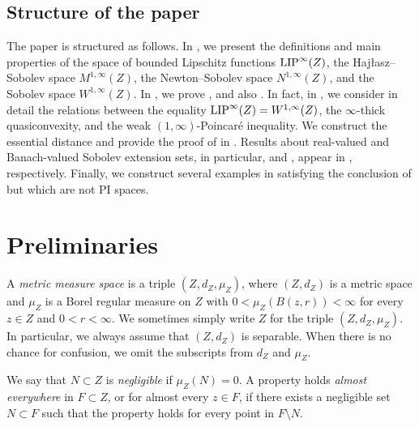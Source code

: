 \documentclass[reqno]{amsart}
\newcommand{\LIP}{{\rm LIP}}
\numberwithin{equation}{section}
\theoremstyle{remark}
\def\fz{\infty}
\begin{document}
\subsection{Structure of the paper}
The paper is structured as follows. In , we present the definitions and main properties of the space of bounded Lipschitz functions $\LIP^{\infty}(Z)$, the Haj{\l}asz--Sobolev space $M^{1,\infty}(Z)$, the Newton--Sobolev space $N^{1,\infty}(Z)$, and the Sobolev space $W^{1,\infty}(Z)$. In , we prove , and also . In fact, in , we consider in detail the relations between the equality $\LIP^{\infty}(Z)=W^{1,\infty}(Z)$, the $\infty$-thick quasiconvexity, and the weak $(1,\infty)$-Poincaré inequality. We construct the essential distance and provide the proof of  in . Results about real-valued and Banach-valued Sobolev extension sets, in particular,  and ,  appear in , respectively. Finally, we construct several examples in  satisfying the conclusion of  but which are not PI spaces.











\section{Preliminaries}\label{sec:prelim}

A \emph{metric measure space} is a triple $( Z, d_Z, \mu_{Z} )$, where $(Z,d_Z)$ is a metric space and $\mu_{Z}$ is a Borel regular measure on $Z$ with $0 < \mu_{Z}( B(z,r) ) < \infty$ for every $z \in Z$ and $0<r<\fz$. We sometimes simply write $Z$ for the triple $( Z, d_Z, \mu_Z )$. In particular, we always assume that $(Z,d_Z)$ is separable. When there is no chance for confusion, we omit the subscripts from $d_{Z}$ and $\mu_{Z}$.  

We say that $N \subset Z$ is \emph{negligible} if $\mu_Z( N ) = 0$. A property holds \emph{almost everywhere} in $F \subset Z$,  or for almost every $z \in F$, if there exists a negligible set $N \subset F$ such that the property holds for every point in $F \setminus N$.
\end{document}
